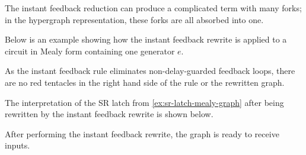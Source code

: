 The instant feedback reduction can produce a complicated term with many forks;
in the hypergraph representation, these forks are all absorbed into one.

\begin{example}\label{ex:instant-feedback-rewrite}
    Below is an example showing how the instant feedback rewrite is applied to
    a circuit in Mealy form containing one generator \(e\).
    \begin{center}
        
    \end{center}
\end{example}

As the instant feedback rule eliminates non-delay-guarded feedback loops, there
are no red tentacles in the right hand side of the rule or the rewritten graph.

\begin{example}\label{ex:sr-latch-instant-feedback-graph}
    The interpretation of the SR latch from \cref{ex:sr-latch-mealy-graph}
    after being rewritten by the instant feedback rewrite is shown below.
    \vspace{-1em}
    \begin{center}
    \end{center}
\end{example}

After performing the instant feedback rewrite, the graph is ready to receive
inputs.

